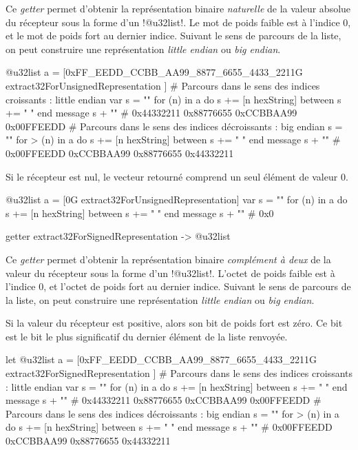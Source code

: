 Ce \emph{getter} permet d'obtenir la représentation binaire \emph{naturelle} de la valeur absolue du récepteur sous la forme d'un \ggsq!@u32list!. Le mot de poids faible est à l'indice $0$, et le mot de poids fort au dernier indice. Suivant le sens de parcours de la liste, on peut construire une représentation \emph{little endian} ou \emph{big endian}.

\begin{galgas4}
@u32list a = [0xFF_EEDD_CCBB_AA99_8877_6655_4433_2211G
  extract32ForUnsignedRepresentation
]
# Parcours dans le sens des indices croissants : little endian
var s = ""
for (n) in a
  do s += [n hexString]
  between s += " "
end
message s + "\n" # 0x44332211 0x88776655 0xCCBBAA99 0x00FFEEDD
# Parcours dans le sens des indices décroissants : big endian
s = ""
for > (n) in a
  do s += [n hexString]
  between s += " "
end
message s + "\n" # 0x00FFEEDD 0xCCBBAA99 0x88776655 0x44332211
\end{galgas4}

Si le récepteur est nul, le vecteur retourné comprend un seul élément de valeur $0$.

\begin{galgas4}
@u32list a = [0G extract32ForUnsignedRepresentation]
var s = ""
for (n) in a
  do s += [n hexString]
  between s += " "
end
message s + "\n" # 0x0
\end{galgas4}





\begin{galgas4box}
getter extract32ForSignedRepresentation -> @u32list
\end{galgas4box}

Ce \emph{getter} permet d'obtenir la représentation binaire \emph{complément à deux} de la valeur du récepteur sous la forme d'un \ggsq!@u32list!. L'octet de poids faible est à l'indice $0$, et l'octet de poids fort au dernier indice. Suivant le sens de parcours de la liste, on peut construire une représentation \emph{little endian} ou \emph{big endian}.

Si la valeur du récepteur est positive, alors son bit de poids fort est zéro. Ce bit est le bit le plus significatif du dernier élément de la liste renvoyée.

\begin{galgas4}
let @u32list a = [0xFF_EEDD_CCBB_AA99_8877_6655_4433_2211G
  extract32ForSignedRepresentation
]
# Parcours dans le sens des indices croissants : little endian
var s = ""
for (n) in a
  do s += [n hexString]
  between s += " "
end
message s + "\n" # 0x44332211 0x88776655 0xCCBBAA99 0x00FFEEDD
# Parcours dans le sens des indices décroissants : big endian
s = ""
for > (n) in a
  do s += [n hexString]
  between s += " "
end
message s + "\n" # 0x00FFEEDD 0xCCBBAA99 0x88776655 0x44332211
\end{galgas4}

